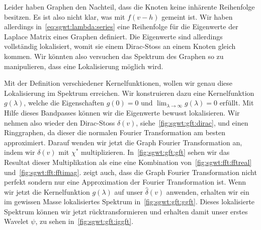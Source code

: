 Leider haben Graphen den Nachteil, dass die Knoten keine inh\"arente 
Reihenfolge besitzen. Es ist also nicht klar, was mit $f(v - h)$ gemeint ist. 
Wir haben allerdings in~\cref{eq:sgwt:lambda:series} eine Reihenfolge f\"ur die 
Eigenwerte der Laplace Matrix eines Graphen definiert. Die Eigenwerte sind 
allerdings vollst\"andig lokalisiert, womit sie einem Dirac-Stoss an einem 
Knoten gleich kommen. Wir k\"onnten also versuchen das Spektrum des Graphen so 
zu manipulieren, dass eine Lokalisierung m\"oglich wird.

Mit der Definition verschiedener Kernelfunktionen, wollen wir genau diese 
Lokalisierung im Spektrum erreichen. Wir konstruieren dazu eine Kernelfunktion 
$g(\lambda)$, welche die Eigenschaften $g(0) = 0$ und $\lim_{\lambda\to\infty} 
g(\lambda) = 0$ erf\"ullt. Mit Hilfe dieses Bandpasses k\"onnen wir die 
Eigenwerte bewusst lokalisieren.
Wir nehmen also wieder den Dirac-Stoss $\delta(v)$, 
siehe~\cref{fig:sgwt:gft:dirac}, und einen Ringgraphen, da dieser die normalen 
Fourier Transformation am besten 
approximiert. Darauf wenden wir jetzt die Graph Fourier Transformation an, 
indem wir $\delta(v)$ mit $\chi^*$ multiplizieren.
In~\cref{fig:sgwt:gft:gft} sehen wir das Resultat dieser Multiplikation als eine
eine Kombination von~\cref{fig:sgwt:fft:fftreal} 
und~\cref{fig:sgwt:fft:fftimag}.  zeigt auch, 
dass die Graph Fourier Transformation nicht perfekt sondern nur eine 
Approximation der Fourier Transformation ist. Wenn wir jetzt die Kernelfunktion 
$g(\lambda)$ auf unser $\hat{\delta}(v)$ anwenden, erhalten wir ein im gewissen 
Masse lokalisiertes Spektrum in~\cref{fig:sgwt:gft:ggft}. Dieses lokalisierte 
Spektrum k\"onnen wir jetzt r\"ucktransformieren und erhalten damit unser 
erstes Wavelet $\psi$, zu sehen in~\cref{fig:sgwt:gft:iggft}.
